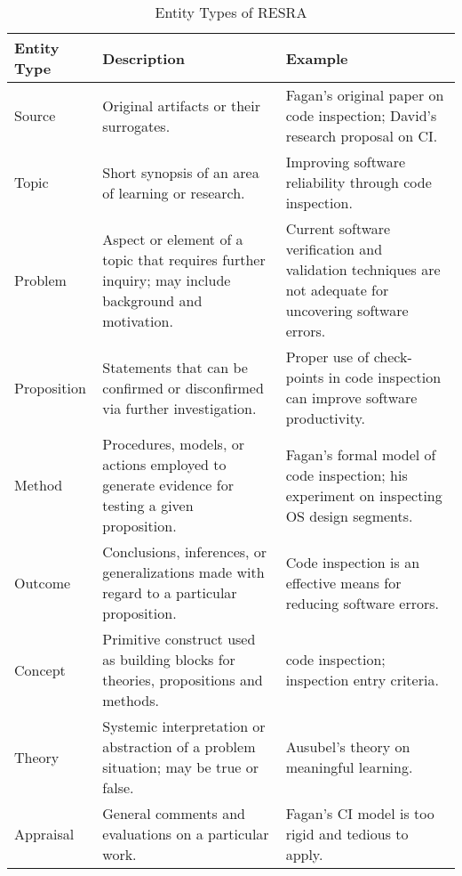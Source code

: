 \begin{table}[ht]
  \begin{center}
    \begin{tabular} {|l|p{2.5in}|p{2.5in}|} \hline   
      {\bf Entity Type} & {\bf Description} & {\bf Example} \\ \hline 
      
      Source & Original artifacts or their surrogates. & Fagan's original paper
      on code inspection; David's research proposal on CI. \\ \hline
      
      Topic & Short synopsis of an area of learning or research. &
      Improving software reliability through code inspection. \\
      \hline
      
      Problem & Aspect or element of a topic that requires further
      inquiry; may include background and motivation. & Current
      software verification and validation techniques are not
      adequate for uncovering software errors. \\ \hline
      
      Proposition & Statements that can be confirmed or disconfirmed
      via further investigation. & Proper use of check-points in
      code inspection can improve software productivity. \\ \hline
      
      Method & Procedures, models, or actions employed to generate evidence for
      testing a given proposition. & Fagan's formal model of code
      inspection; his experiment on inspecting OS design segments. \\ \hline
      
      Outcome & Conclusions, inferences, or generalizations made with
      regard to a particular proposition. & Code inspection
      is an effective means for reducing software errors. \\ \hline
      
      Concept & Primitive construct used as building blocks for
      theories, propositions and methods. & code inspection;
      inspection entry criteria. \\ \hline
      
      Theory & Systemic interpretation or abstraction of a problem
      situation; may be true or false. & Ausubel's theory on
      meaningful learning. \\ \hline
      
      Appraisal & General comments and evaluations on a particular
      work. & Fagan's CI model is too rigid and tedious to apply. \\
      \hline
    \end{tabular}
    \caption{Entity Types of RESRA}
    \label{tab-er}
  \end{center}
\end{table}

